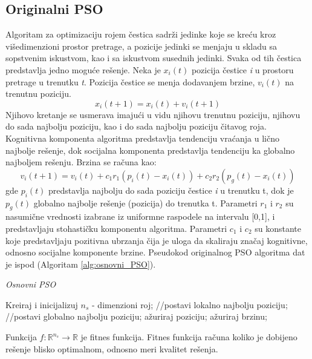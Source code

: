 \documentclass[a4paper]{article}
\begin{document}
\subsection{Originalni PSO}
Algoritam za optimizaciju rojem čestica sadrži jedinke koje se kreću kroz višedimenzioni prostor pretrage, a pozicije jedinki se menjaju u skladu sa sopstvenim iskustvom, kao i sa iskustvom susednih jedinki. Svaka od tih čestica predstavlja jedno moguće rešenje.
Neka je $x_i(t)$ pozicija čestice \textit{i} u prostoru pretrage u trenutku \textit{t}. Pozicija čestice se menja dodavanjem brzine, $v_i(t)$ na trenutnu poziciju. \[x_i(t+1) = x_i(t) + v_i(t+1) \]
Njihovo kretanje se usmerava imajući u vidu njihovu trenutnu poziciju, njihovu do sada najbolju poziciju, kao i do sada najbolju poziciju čitavog roja. Kognitivna komponenta algoritma predstavlja tendenciju vraćanja u lično najbolje rešenje, dok socijalna komponenta predstavlja tendenciju ka globalno najboljem rešenju. Brzina se računa kao: \[ v_i(t+1) = v_i(t) + c_1r_1(p_i(t) - x_i(t)) + c_2r_2(p_g(t) - x_i(t))\]
gde $p_i(t)$ predstavlja najbolju do sada poziciju čestice \textit{i} u trenutku t, dok je $p_g(t)$ globalno najbolje rešenje (pozicija) do trenutka t. Parametri $r_1$ i $r_2$ su nasumične vrednosti izabrane iz uniformne raspodele na intervalu [0,1], i predstavljaju stohastičku komponentu algoritma. Parametri $c_1$ i $c_2$ su konstante koje predstavljaju pozitivna ubrzanja čija je uloga da skaliraju značaj kognitivne, odnosno socijalne komponente brzine. Pseudokod originalnog PSO algoritma dat je ispod (Algoritam \ref{alg:osnovni_PSO}).


\begin{algorithm}
\small
\caption{\textit{Osnovni PSO} }
\label{alg:osnovni_PSO}  
\begin{algorithmic} 
\STATE Kreiraj i inicijalizuj $n_s$ - dimenzioni roj;
\REPEAT
        \STATE //postavi lokalno najbolju poziciju;
        \ENDIF
        \STATE //postavi globalno najbolju poziciju;
        \ENDIF
    \ENDFOR
        \STATE ažuriraj poziciju;
        \STATE ažuriraj brzinu;
     \ENDFOR
{}
\end{algorithmic}  
\end{algorithm} 

Funkcija $f:\mathbb{R}^{n_s} \to \mathbb{R}$ je fitnes funkcija. Fitnes funkcija računa koliko je dobijeno rešenje blisko optimalnom, odnosno meri kvalitet rešenja.
\end{document}
